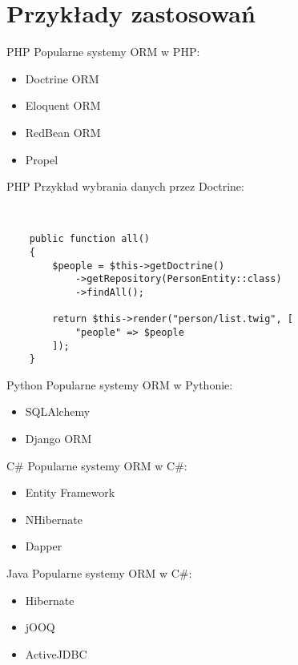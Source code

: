 \section{Przykłady zastosowań}

\begin{frame}[fragile]{PHP}
	Popularne systemy ORM w PHP:
	\begin{itemize}
		\item Doctrine ORM
		\item Eloquent ORM
		\item RedBean ORM
		\item Propel
	\end{itemize}
\end{frame}

\begin{frame}[fragile]{PHP}
	Przykład wybrania danych przez Doctrine:
	
	\ \\
		
	\begin{lstlisting}	
    public function all()
    {
        $people = $this->getDoctrine()
            ->getRepository(PersonEntity::class)
            ->findAll();

        return $this->render("person/list.twig", [
            "people" => $people
        ]);
    }
	\end{lstlisting}
\end{frame}

\begin{frame}[fragile]{Python}
	Popularne systemy ORM w Pythonie:
	\begin{itemize}
		\item SQLAlchemy
		\item Django ORM
	\end{itemize}
\end{frame}

\begin{frame}[fragile]{C\#}
	Popularne systemy ORM w C\#:
	\begin{itemize}
		\item Entity Framework
		\item NHibernate
		\item Dapper
	\end{itemize}
\end{frame}

\begin{frame}[fragile]{Java}
	Popularne systemy ORM w C\#:
	\begin{itemize}
		\item Hibernate
		\item jOOQ
		\item ActiveJDBC
	\end{itemize}
\end{frame}

